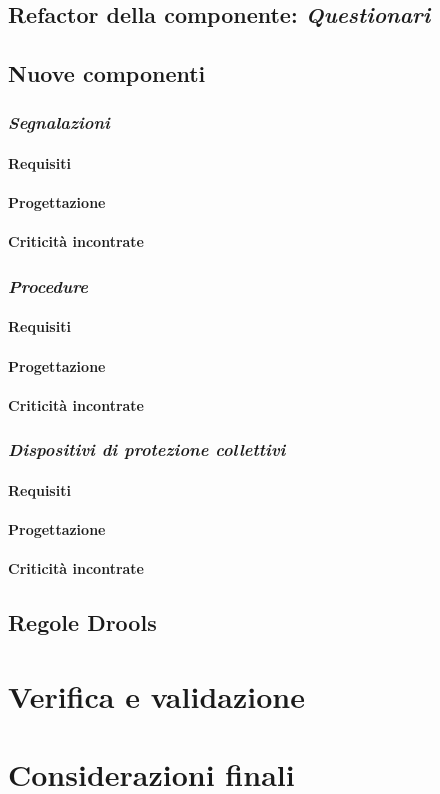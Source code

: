 \subsection{Refactor della componente: \textit{Questionari}}


\subsection{Nuove componenti}
\subsubsection{\textit{Segnalazioni}}
	\paragraph{Requisiti}
	\paragraph{Progettazione}
	\paragraph{Criticità incontrate}
\subsubsection{\textit{Procedure}}
	\paragraph{Requisiti}
	\paragraph{Progettazione}
	\paragraph{Criticità incontrate}
\subsubsection{\textit{Dispositivi di protezione collettivi}}
	\paragraph{Requisiti}
	\paragraph{Progettazione}
	\paragraph{Criticità incontrate}


\subsection{Regole Drools}
	
\section{Verifica e validazione}
\section{Considerazioni finali}